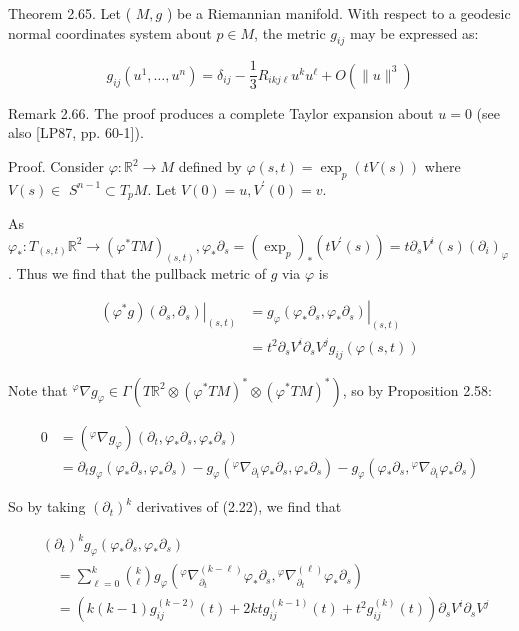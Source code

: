 \documentclass[10pt, letterpaper]{article}
\begin{document}
Theorem 2.65. Let ( $M, g$ ) be a Riemannian manifold. With respect to a geodesic normal coordinates system about $p \in M$, the metric $g_{i j}$ may be expressed as:

$$
g_{i j}\left(u^{1}, \ldots, u^{n}\right)=\delta_{i j}-\frac{1}{3} R_{i k j \ell} u^{k} u^{\ell}+O\left(\|u\|^{3}\right)
$$

Remark 2.66. The proof produces a complete Taylor expansion about $u=0$ (see also [LP87, pp. 60-1]).

Proof. Consider $\varphi: \mathbb{R}^{2} \rightarrow M$ defined by $\varphi(s, t)=\exp _{p}(t V(s))$ where $V(s) \in$ $S^{n-1} \subset T_{p} M$. Let $V(0)=u, V^{\prime}(0)=v$.

As $\varphi_{*}: T_{(s, t)} \mathbb{R}^{2} \rightarrow\left(\varphi^{*} T M\right)_{(s, t)}, \varphi_{*} \partial_{s}=\left(\exp _{p}\right)_{*}\left(t V^{\prime}(s)\right)=t \partial_{s} V^{i}(s)\left(\partial_{i}\right)_{\varphi}$. Thus we find that the pullback metric of $g$ via $\varphi$ is

$$
\begin{aligned}
\left.\left(\varphi^{*} g\right)\left(\partial_{s}, \partial_{s}\right)\right|_{(s, t)} & =\left.g_{\varphi}\left(\varphi_{*} \partial_{s}, \varphi_{*} \partial_{s}\right)\right|_{(s, t)} \\
& =t^{2} \partial_{s} V^{i} \partial_{s} V^{j} g_{i j}(\varphi(s, t))
\end{aligned}
$$

Note that ${ }^{\varphi} \nabla g_{\varphi} \in \Gamma\left(T \mathbb{R}^{2} \otimes\left(\varphi^{*} T M\right)^{*} \otimes\left(\varphi^{*} T M\right)^{*}\right)$, so by Proposition 2.58:

$$
\begin{aligned}
0 & =\left({ }^{\varphi} \nabla g_{\varphi}\right)\left(\partial_{t}, \varphi_{*} \partial_{s}, \varphi_{*} \partial_{s}\right) \\
& =\partial_{t} g_{\varphi}\left(\varphi_{*} \partial_{s}, \varphi_{*} \partial_{s}\right)-g_{\varphi}\left({ }^{\varphi} \nabla_{\partial_{t}} \varphi_{*} \partial_{s}, \varphi_{*} \partial_{s}\right)-g_{\varphi}\left(\varphi_{*} \partial_{s},{ }^{\varphi} \nabla_{\partial_{t}} \varphi_{*} \partial_{s}\right)
\end{aligned}
$$

So by taking $\left(\partial_{t}\right)^{k}$ derivatives of (2.22), we find that

$$
\begin{aligned}
& \left(\partial_{t}\right)^{k} g_{\varphi}\left(\varphi_{*} \partial_{s}, \varphi_{*} \partial_{s}\right) \\
& \quad=\sum_{\ell=0}^{k}\binom{k}{\ell} g_{\varphi}\left({ }^{\varphi} \nabla_{\partial_{t}}^{(k-\ell)} \varphi_{*} \partial_{s},{ }^{\varphi} \nabla_{\partial_{t}}^{(\ell)} \varphi_{*} \partial_{s}\right) \\
& \quad=\left(k(k-1) g_{i j}^{(k-2)}(t)+2 k t g_{i j}^{(k-1)}(t)+t^{2} g_{i j}^{(k)}(t)\right) \partial_{s} V^{i} \partial_{s} V^{j}
\end{aligned}
$$
\end{document}
